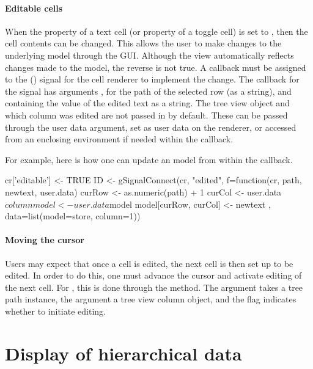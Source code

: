 \paragraph{Editable cells} When the  property of a text
cell (or  property of a toggle cell) is set to
, then the cell contents can be changed. This allows the
user to make changes to the underlying model through the GUI. Although
the view automatically reflects changes made to the model, the reverse
is not true. A callback must be assigned to the 
() signal for the cell renderer to implement the
change. The callback for the  signal has arguments
,  for the path of the selected row (as a
string), and  containing the value of the edited text
as a string. The tree view object and which column was edited are not
passed in by default. These can be passed through the user data
argument, set as user data on the renderer, or accessed from an
enclosing environment if needed within the callback.

For example, here is how one can update an  model
from within the callback.
\begin{Schunk}
\begin{Sinput}
 cr['editable'] <- TRUE
 ID <- gSignalConnect(cr, "edited", 
 f=function(cr, path, newtext, user.data) {
   curRow <- as.numeric(path) + 1
   curCol <- user.data$column
   model <- user.data$model
   model[curRow, curCol] <- newtext
 }, data=list(model=store, column=1))
\end{Sinput}
\end{Schunk}

\paragraph{Moving the cursor}

Users may expect that once a cell is edited, the next cell is then set
up to be edited. In order to do this, one must advance the cursor and
activate editing of the next cell. For , this is
done through the  method. The
 argument takes a tree path instance, the 
argument a tree view column object, and the flag 
indicates whether to initiate editing.


\section{Display of hierarchical data}
\label{sec:RGtk2:mvc:GtkTreeStore}

